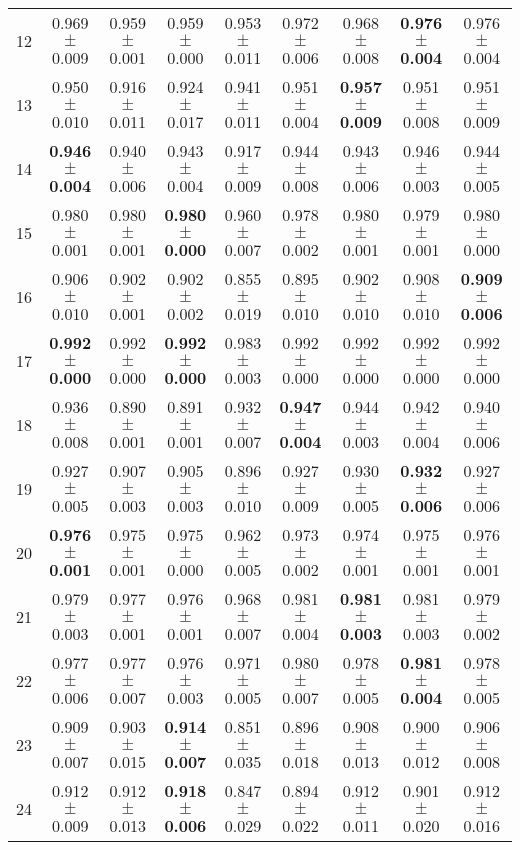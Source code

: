 \begin{table}[!ht]
{\begin{tabular}{r c c c c c c c c}
12 & 0.969 $\pm$ 0.009 & 0.959 $\pm$ 0.001 & 0.959 $\pm$ 0.000 & 0.953 $\pm$ 0.011 & 0.972 $\pm$ 0.006 & 0.968 $\pm$ 0.008 & \textbf{0.976 $\pm$ 0.004} & 0.976 $\pm$ 0.004 \\
13 & 0.950 $\pm$ 0.010 & 0.916 $\pm$ 0.011 & 0.924 $\pm$ 0.017 & 0.941 $\pm$ 0.011 & 0.951 $\pm$ 0.004 & \textbf{0.957 $\pm$ 0.009} & 0.951 $\pm$ 0.008 & 0.951 $\pm$ 0.009 \\
14 & \textbf{0.946 $\pm$ 0.004} & 0.940 $\pm$ 0.006 & 0.943 $\pm$ 0.004 & 0.917 $\pm$ 0.009 & 0.944 $\pm$ 0.008 & 0.943 $\pm$ 0.006 & 0.946 $\pm$ 0.003 & 0.944 $\pm$ 0.005 \\
15 & 0.980 $\pm$ 0.001 & 0.980 $\pm$ 0.001 & \textbf{0.980 $\pm$ 0.000} & 0.960 $\pm$ 0.007 & 0.978 $\pm$ 0.002 & 0.980 $\pm$ 0.001 & 0.979 $\pm$ 0.001 & 0.980 $\pm$ 0.000 \\
16 & 0.906 $\pm$ 0.010 & 0.902 $\pm$ 0.001 & 0.902 $\pm$ 0.002 & 0.855 $\pm$ 0.019 & 0.895 $\pm$ 0.010 & 0.902 $\pm$ 0.010 & 0.908 $\pm$ 0.010 & \textbf{0.909 $\pm$ 0.006} \\
17 & \textbf{0.992 $\pm$ 0.000} & 0.992 $\pm$ 0.000 & \textbf{0.992 $\pm$ 0.000} & 0.983 $\pm$ 0.003 & 0.992 $\pm$ 0.000 & 0.992 $\pm$ 0.000 & 0.992 $\pm$ 0.000 & 0.992 $\pm$ 0.000 \\
18 & 0.936 $\pm$ 0.008 & 0.890 $\pm$ 0.001 & 0.891 $\pm$ 0.001 & 0.932 $\pm$ 0.007 & \textbf{0.947 $\pm$ 0.004} & 0.944 $\pm$ 0.003 & 0.942 $\pm$ 0.004 & 0.940 $\pm$ 0.006 \\
19 & 0.927 $\pm$ 0.005 & 0.907 $\pm$ 0.003 & 0.905 $\pm$ 0.003 & 0.896 $\pm$ 0.010 & 0.927 $\pm$ 0.009 & 0.930 $\pm$ 0.005 & \textbf{0.932 $\pm$ 0.006} & 0.927 $\pm$ 0.006 \\
20 & \textbf{0.976 $\pm$ 0.001} & 0.975 $\pm$ 0.001 & 0.975 $\pm$ 0.000 & 0.962 $\pm$ 0.005 & 0.973 $\pm$ 0.002 & 0.974 $\pm$ 0.001 & 0.975 $\pm$ 0.001 & 0.976 $\pm$ 0.001 \\
21 & 0.979 $\pm$ 0.003 & 0.977 $\pm$ 0.001 & 0.976 $\pm$ 0.001 & 0.968 $\pm$ 0.007 & 0.981 $\pm$ 0.004 & \textbf{0.981 $\pm$ 0.003} & 0.981 $\pm$ 0.003 & 0.979 $\pm$ 0.002 \\
22 & 0.977 $\pm$ 0.006 & 0.977 $\pm$ 0.007 & 0.976 $\pm$ 0.003 & 0.971 $\pm$ 0.005 & 0.980 $\pm$ 0.007 & 0.978 $\pm$ 0.005 & \textbf{0.981 $\pm$ 0.004} & 0.978 $\pm$ 0.005 \\
23 & 0.909 $\pm$ 0.007 & 0.903 $\pm$ 0.015 & \textbf{0.914 $\pm$ 0.007} & 0.851 $\pm$ 0.035 & 0.896 $\pm$ 0.018 & 0.908 $\pm$ 0.013 & 0.900 $\pm$ 0.012 & 0.906 $\pm$ 0.008 \\
24 & 0.912 $\pm$ 0.009 & 0.912 $\pm$ 0.013 & \textbf{0.918 $\pm$ 0.006} & 0.847 $\pm$ 0.029 & 0.894 $\pm$ 0.022 & 0.912 $\pm$ 0.011 & 0.901 $\pm$ 0.020 & 0.912 $\pm$ 0.016 \\

\end{tabular}}
\end{table}
